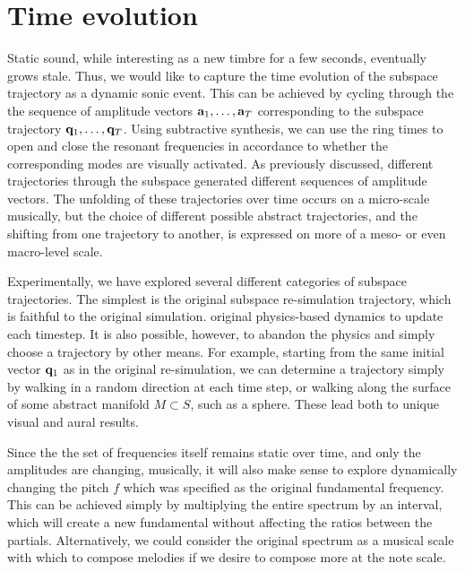 \documentclass[11pt]{article}
\begin{document}
\section*{Time evolution}
Static sound, while interesting as a new timbre for a few seconds, eventually grows stale. Thus, we would like to capture the time evolution of the subspace trajectory as a dynamic sonic event. This can be achieved by cycling through the the sequence of amplitude vectors $\mathbf{a}_1, \ldots, \mathbf{a}_T$ corresponding to the subspace trajectory $\mathbf{q}_1, \ldots, \mathbf{q}_T$. Using subtractive synthesis, we can use the ring times to open and close the resonant frequencies in accordance to whether the corresponding modes are visually activated. As previously discussed, different trajectories through the subspace generated different sequences of amplitude vectors. The unfolding of these trajectories over time occurs on a micro-scale musically, but the choice of different possible abstract trajectories, and the shifting from one trajectory to another, is expressed on more of a meso- or even macro-level scale.

Experimentally, we have explored several different categories of subspace trajectories. The simplest is the original subspace re-simulation trajectory, which is faithful to the original simulation. original physics-based dynamics to update each timestep. It is also possible, however, to abandon the physics and simply choose a trajectory by other means. For example, starting from the same initial vector $\mathbf{q}_1$ as in the original re-simulation, we can determine a trajectory simply by walking in a random direction at each time step, or walking along the surface of some abstract manifold $M \subset S$, such as a sphere. These lead both to unique visual and aural results. 

Since the the set of frequencies itself remains static over time, and only the amplitudes are changing, musically, it will also make sense to explore dynamically changing the pitch $f$ which was specified as the original fundamental frequency. This can be achieved simply by multiplying the entire spectrum by an interval, which will create a new fundamental without affecting the ratios between the partials. Alternatively, we could consider the original spectrum as a musical scale with which to compose melodies if we desire to compose more at the note scale.







\fontsize{10}{12}

\end{document}
